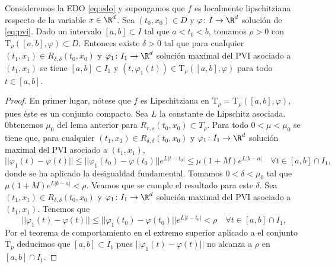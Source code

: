 \begin{proposition}
  Consideremos la EDO \eqref{eq:edo} y supongamos que $f$ es localmente lipschitziana respecto de la
  variable $x \in \R^d$. Sea $(t_0, x_0) \in D$ y $\varphi \colon I \to \R^d$ solución de
  \eqref{eq:pvi}. Dado un intervalo $[a,b] \subset I$ tal que $a < t_0 < b$, tomamos $\rho > 0$ con
  $\mathrm{T}_{\rho}([a,b],\varphi) \subset D$. Entonces existe $\delta > 0$ tal que para cualquier
  $(t_1, x_1) \in R_{\delta,\delta}(t_0,x_0)$ y $\varphi_1 \colon I_1 \to \R^d$ solución maximal del
  PVI asociado a $(t_1,x_1)$ se tiene $[a,b] \subset I_1$ y
  $(t,\varphi_1(t)) \in \mathrm{T}_\rho([a,b],\varphi)$ para todo $t \in [a,b]$.
\end{proposition}
\begin{proof}
  En primer lugar, nótese que $f$ es Lipschitziana en
  $\mathrm{T}_{\rho} = \mathrm{T}_{\rho}([a,b],\varphi)$, pues éste es un conjunto compacto. Sea $L$
  la constante de Lipschitz asociada. 0btenemos $\mu_0$ del lema anterior para
  $R_{r,s}(t_0, x_0) \subset T_{\rho}$. Para todo $0 < \mu < \mu_0$ se tiene que, para cualquier
  $(t_1, x_1) \in R_{\delta,\delta}(t_0,x_0)$ y $\varphi_1 \colon I_1 \to \R^d$ solución maximal del
  PVI asociado a $(t_1,x_1)$,
  \[ ||\varphi_1(t) - \varphi(t)|| \le ||\varphi_1(t_0) - \varphi(t_0)|| e^{L |t-t_0|} \le \mu(1+M)
    e^{L |b-a|} \quad \forall t \in [a,b]\cap I_1, \] donde se ha aplicado la desigualdad
  fundamental. Tomamos $0 < \delta < \mu_0$ tal que $\mu(1+M) e^{L |b-a|} < \rho$. Veamos que se
  cumple el resultado para este $\delta$. Sea $(t_1, x_1) \in R_{\delta,\delta}(t_0,x_0)$ y
  $\varphi_1 \colon I_1 \to \R^d$ solución maximal del PVI asociado a $(t_1,x_1)$. Tenemos que
  \[ ||\varphi_1(t) - \varphi(t)|| \le ||\varphi_1(t_0) - \varphi(t_0)|| e^{L |t-t_0|} < \rho \quad
    \forall t \in [a,b]\cap I_1, \] Por el teorema de comportamiento en el extremo superior aplicado
  a el conjunto $\mathrm{T}_p$ deducimos que $[a,b] \subset I_1$ pues $||\varphi_1(t)-\varphi(t)||$
  no alcanza a $\rho$ en $[a,b] \cap I_1$.
\end{proof}

